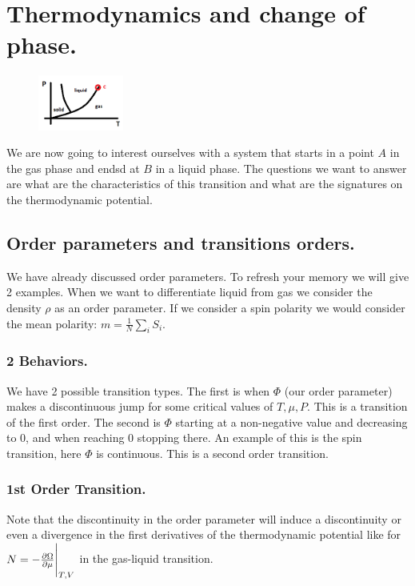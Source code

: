 \documentclass[10pt,a4paper]{book}
\begin{document}
\section{Thermodynamics and change of phase.}
\begin{figure}
    \includegraphics[width=0.25\textwidth]{graphs/critpoint}
\end{figure}
We are now going to interest ourselves with a system that starts in a point $A$ in the gas phase and endsd at $B$ in a liquid phase. The questions we want to answer are what are the characteristics of this transition and what are the signatures on the thermodynamic potential.

\subsection{Order parameters and transitions orders.}
We have already discussed order parameters. To refresh your memory we will give 2 examples. When we want to differentiate liquid from gas we consider the density $\rho$ as an order parameter. If we consider a spin polarity we would consider the mean polarity: $m = \frac{1}{N}\sum_i S_i$.

\subsubsection{2 Behaviors.}
We have 2 possible transition types. The first is when $\Phi$ (our order parameter) makes a discontinuous jump for some critical values of $T, \mu, P$. This is a transition of the first order. The second is $\Phi$ starting at a non-negative value and decreasing to 0, and when reaching 0 stopping there. An example of this is the spin transition, here $\Phi$ is continuous. This is a second order transition.

\subsubsection{1st Order Transition.}
Note that the discontinuity in the order parameter will induce a discontinuity or even a divergence in the first derivatives of the thermodynamic potential like for $N = -\pdv{\Omega}{\mu}\Bigg|_{T,V}$ in the gas-liquid transition.
\end{document}
